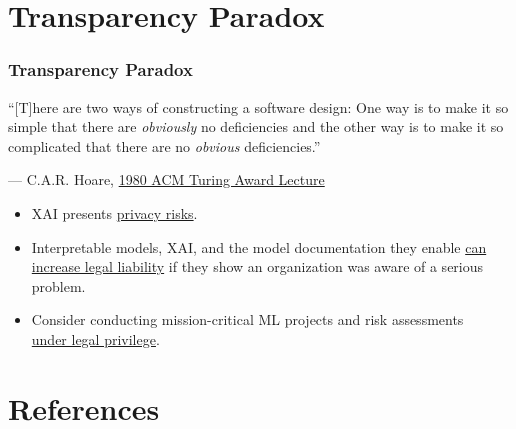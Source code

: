 \documentclass[11pt,
               aspectratio=169,
               hyperref={colorlinks}
               ]{beamer}
\begin{document}
	\section{Transparency Paradox}


	\begin{frame}[t]
		
		\frametitle{Transparency Paradox}
		
		\epigraph{``[T]here are two ways of constructing a software design: One way is to make it so simple that there are \textit{obviously} no deficiencies and the other way is to make it so complicated that there are no \textit{obvious} deficiencies.''}{--- C.A.R. Hoare, \href{http://www.cs.fsu.edu/~engelen/courses/COP4610/hoare.pdf}{1980 ACM Turing Award Lecture}}		
		
		\begin{itemize}
		\item XAI presents \href{https://arxiv.org/abs/1907.00164}{privacy risks}.
		\item Interpretable models, XAI, and the model documentation they enable \href{https://www.hhs.gov/about/news/2018/06/18/judge-rules-in-favor-of-ocr-and-requires-texas-cancer-center-to-pay-4.3-million-in-penalties-for-hipaa-violations.html}{can increase legal liability} if they show an organization was aware of a serious problem.
		\item Consider conducting mission-critical ML projects and risk assessments\\ \href{https://hbr.org/2019/12/the-ai-transparency-paradox}{under legal privilege}.
		\end{itemize}
		
		
	\end{frame}


	\section{References}
\end{document}
